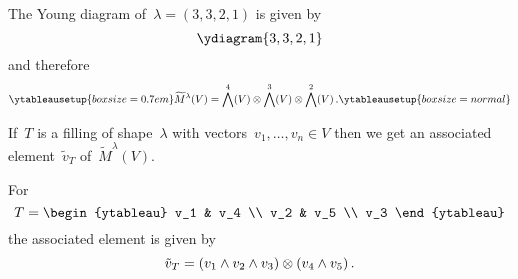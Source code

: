 \documentclass[a4paper,10pt]{scrartcl}
\begin{document}
\begin{example}
  The Young diagram of~$\lambda = (3,3,2,1)$ is given by
  \[
    \ydiagram{3,3,2,1}
  \]
  and therefore
  \[
    \ytableausetup{boxsize=0.7em}
    \widetilde{M}^{\lambda}(V)
    =
    \Exterior^4(V) \tensor \Exterior^3(V) \tensor \Exterior^2(V) \,.
    \ytableausetup{boxsize=normal}
  \]
\end{example}

If~$T$ is a filling of shape~$\lambda$ with vectors~$v_1, \dotsc, v_n \in V$ then we get an associated element~$\tilde{v}_T$ of~$\widetilde{M}^{\lambda}(V)$.

\begin{example}
  For
  \[
    T
    =
    \begin{ytableau}
      v_1 & v_4 \\
      v_2 & v_5 \\
      v_3
    \end{ytableau}
  \]
  the associated element is given by
  \[
    \tilde{v}_T
    =
    (v_1 \wedge v_2 \wedge v_3) \otimes (v_4 \wedge v_5) \,.
  \]
\end{example}
\end{document}
